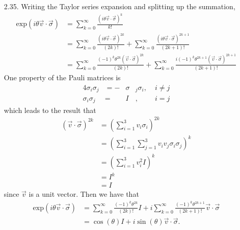 \documentclass[a4paper,12pt]{article}
\begin{document}
\begin{enumerate}
	\item[2.35.] Writing the Taylor series expansion and splitting up the summation,
	\begin{align*}
		\mbox{exp}(i \theta \vec{v} \cdot \vec{\sigma}) &= \sum_{k = 0}^{\infty} \frac{(i \theta \vec{v} \cdot \vec{\sigma})^k}{k!} \\
		&= \sum_{k = 0}^{\infty} \frac{(i \theta \vec{v} \cdot \vec{\sigma})^{2k}}{(2k)!} + \sum_{k = 0}^{\infty} \frac{(i \theta \vec{v} \cdot \vec{\sigma})^{2k + 1}}{(2k + 1)!} \\
		&= \sum_{k = 0}^{\infty} \frac{(-1)^k \theta^{2k} (\vec{v} \cdot \vec{\sigma})^{2k}}{(2k)!} + \sum_{k = 0}^{\infty} \frac{i (-1)^k \theta^{2k + 1} (\vec{v} \cdot \vec{\sigma})^{2k + 1}}{(2k + 1)!}
	\end{align*}
	One property of the Pauli matrices is
	\begin{alignat*}{4}
        \sigma_i \sigma_j &= - &\sigma&_j \sigma_i, & \; i \neq j \\
        \sigma_i \sigma_j &=   &  I   &,            & \; i = j
	\end{alignat*}
	which leads to the result that
	\begin{align*}
		(\vec{v} \cdot \vec{\sigma})^{2k} &= \left( \sum_{i = 1}^{3} v_i \sigma_i \right)^{2k} \\
		&= \left( \sum_{i = 1}^{3} \sum_{j = 1}^{3} v_i v_j \sigma_i \sigma_j \right)^k \\
		&= \left( \sum_{i = 1}^{3} v_i^2 I \right)^k \\
		&= I^k \\
		&= I
	\end{align*}
	since $\vec{v}$ is a unit vector. Then we have that
	\begin{align*}
		\mbox{exp}(i \theta \vec{v} \cdot \vec{\sigma}) &= \sum_{k = 0}^{\infty} \frac{(-1)^k \theta^{2k}}{(2k)!} I + i \sum_{k = 0}^{\infty} \frac{(-1)^k \theta^{2k + 1}}{(2k + 1)!} \vec{v} \cdot \vec{\sigma} \\
		&= \cos(\theta) I + i \sin(\theta) \vec{v} \cdot \vec{\sigma}.
	\end{align*}

\end{enumerate}
\end{document}
